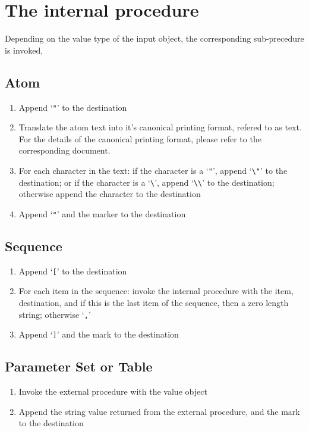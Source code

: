 \documentclass[12pt]{article}
\begin{document}
\section*{The internal procedure}

Depending on the value type of the input object, the corresponding sub-precedure is 
invoked,

\subsection*{Atom}
\begin{enumerate}
\item Append `\verb+"+' to the destination
\item Translate the atom text into it's canonical printing format, refered to
      as text. For the details of the canonical printing format, please refer to the 
      corresponding document.
\item For each character in the text: if the character is a `\verb+"+',
      append `\verb+\"+' to the destination; or if the character is a
      `\verb+\+', append `\verb+\\+' to the destination; otherwise append 
      the character to the destination
\item Append `\verb+"+' and the marker to the destination
\end{enumerate}

\subsection*{Sequence}
\begin{enumerate}
\item Append `\verb+[+' to the destination
\item For each item in the sequence: invoke the internal procedure
      with the item, destination, and if this is the last item of the 
      sequence, then a zero length string; otherwise `\verb+,+'
\item Append `\verb+]+' and the mark to the destination
\end{enumerate}

\subsection*{Parameter Set or Table}
\begin{enumerate}
\item Invoke the external procedure with the value object
\item Append the string value returned from the external procedure, and the mark to the
      destination
\end{enumerate}
\end{document}
